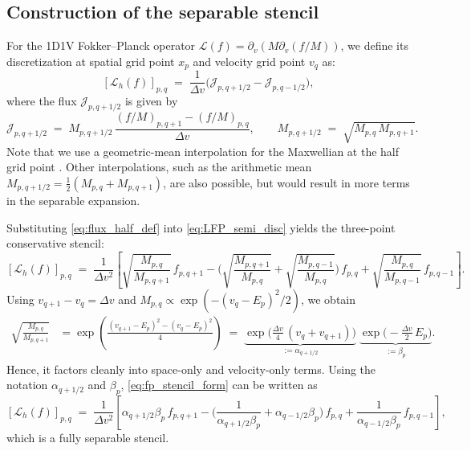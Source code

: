 \documentclass[]{article}
\numberwithin{equation}{section}
\begin{document}
\subsection{Construction of the separable stencil}
For the 1D1V Fokker--Planck operator $\mathcal{L}(f) = \partial_v (M \partial_v (f/M))$, we define its discretization at spatial grid point \(x_p\) and velocity grid point \(v_q\) as:
\begin{equation}\label{eq:LFP_semi_disc}
  [\mathcal{L}_{h}(f)]_{p,q}
  \;=\;\frac{1}{\Delta v}\Big(\mathcal{J}_{p,q+1/2}-\mathcal{J}_{p,q-1/2}\Big),
\end{equation}
where the flux $\mathcal{J}_{p,q+1/2}$ is given by
\begin{equation}\label{eq:flux_half_def}
  \mathcal{J}_{p,q+1/2}
  \;=\; M_{p,q+1/2}\,\frac{(f/M)_{p,q+1}-(f/M)_{p,q}}{\Delta v},
  \qquad
  M_{p,q+1/2}\;=\;\sqrt{M_{p,q}\,M_{p,q+1}}.
\end{equation}
Note that we use a geometric-mean interpolation for the Maxwellian at the half grid point \cite{JY11}. Other interpolations, such as the arithmetic mean $M_{p,q+1/2} = \frac{1}{2}(M_{p,q} + M_{p,q+1})$, are also possible, but would result in more terms in the separable expansion.

Substituting \eqref{eq:flux_half_def} into \eqref{eq:LFP_semi_disc} yields the three-point conservative stencil:
\begin{equation}\label{eq:fp_stencil_form}
  [\mathcal{L}_{h}(f)]_{p,q}
  \;=\;\frac{1}{\Delta v^2} \left[
    \sqrt{\frac{M_{p,q}}{M_{p,q+1}}}\,f_{p,q+1}
    -\Big(\sqrt{\frac{M_{p,q+1}}{M_{p,q}}}+\sqrt{\frac{M_{p,q-1}}{M_{p,q}}}\Big)\,f_{p,q}
    +\sqrt{\frac{M_{p,q}}{M_{p,q-1}}}\,f_{p,q-1}
  \right].
\end{equation}
Using $v_{q+1}-v_q=\Delta v$ and $M_{p,q} \propto \exp (-(v_q-E_p)^2/2)$, we obtain
\begin{align}
  \sqrt{\frac{M_{p,q}}{M_{p,q+1}}}
  &= \exp \left(\frac{(v_{q+1}-E_p)^2-(v_q-E_p)^2}{4}\right)
   \;=\; \underbrace{\exp \Big(\tfrac{\Delta v}{4}\,(v_q+v_{q+1})\Big)}_{\displaystyle :=\alpha_{q+1/2}}
       \;\underbrace{\exp \Big(-\tfrac{\Delta v}{2}\,E_p\Big)}_{\displaystyle :=\beta_p}.\label{eq:ratio_plus}
\end{align}
Hence, it factors cleanly into space-only and velocity-only terms. Using the notation $\alpha_{q+1/2}$ and $\beta_p$, \eqref{eq:fp_stencil_form} can be written as
\begin{equation}\label{eq:fp_discrete_separable}
  [\mathcal{L}_{h}(f)]_{p,q}
  \;=\;\frac{1}{\Delta v^2} \left[
     \alpha_{q+1/2}\beta_p\,f_{p,q+1}
     -\Big(\frac{1}{\alpha_{q+1/2}\beta_p}+\alpha_{q-1/2}\beta_p\Big)\,f_{p,q}
     +\frac{1}{\alpha_{q-1/2} \beta_p} \,f_{p,q-1}
  \right],
\end{equation}
which is a fully separable stencil.
\end{document}
